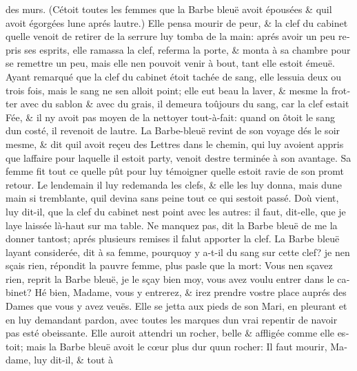 \documentclass[14pt,a4paper]{memoir}
\begin{document}
\begin{otherlanguage}{french}
des murs. (C\textquotesingle étoit toutes les femmes que la Barbe bleuë
avoit épousées \& qu\textquotesingle il avoit égorgées
l\textquotesingle une aprés l\textquotesingle autre.) Elle pensa mourir
de peur, \& la clef du cabinet qu\textquotesingle elle venoit de retirer
de la serrure luy tomba de la main: aprés avoir un peu repris ses
esprits, elle ramassa la clef, referma la porte, \& monta à sa chambre
pour se remettre un peu, mais elle n\textquotesingle en pouvoit venir à
bout, tant elle estoit émeuë. Ayant remarqué que la clef du cabinet
étoit tachée de sang, elle l\textquotesingle essuia deux ou trois fois,
mais le sang ne s\textquotesingle en alloit point; elle eut beau la
laver, \& mesme la frotter avec du sablon \& avec du grais, il demeura
toûjours du sang, car la clef estait Fée, \& il n\textquotesingle y
avoit pas moyen de la nettoyer tout-à-fait: quand on ôtoit le sang
d\textquotesingle un costé, il revenoit de l\textquotesingle autre. La
Barbe-bleuë revint de son voyage dés le soir mesme, \& dit
qu\textquotesingle il avoit reçeu des Lettres dans le chemin, qui luy
avoient appris que l\textquotesingle affaire pour laquelle il estoit
party, venoit d\textquotesingle estre terminée à son avantage. Sa femme
fit tout ce qu\textquotesingle elle pût pour luy témoigner
qu\textquotesingle elle estoit ravie de son promt retour. Le lendemain
il luy redemanda les clefs, \& elle les luy donna, mais
d\textquotesingle une main si tremblante, qu\textquotesingle il devina
sans peine tout ce qui s\textquotesingle estoit passé.
D\textquotesingle où vient, luy dit-il, que la clef du cabinet
n\textquotesingle est point avec les autres: il faut, dit-elle, que je
l\textquotesingle aye laissée là-haut sur ma table. Ne manquez pas, dit
la Barbe bleuë de me la donner tantost; aprés plusieurs remises il falut
apporter la clef. La Barbe bleuë l\textquotesingle ayant considerée, dit
à sa femme, pourquoy y a-t-il du sang sur cette clef? je
n\textquotesingle en sçais rien, répondit la pauvre femme, plus pasle
que la mort: Vous n\textquotesingle en sçavez rien, reprit la Barbe
bleuë, je le sçay bien moy, vous avez voulu entrer dans le cabinet? Hé
bien, Madame, vous y entrerez, \& irez prendre vostre place auprés des
Dames que vous y avez veuës. Elle se jetta aux pieds de son Mari, en
pleurant et en luy demandant pardon, avec toutes les marques
d\textquotesingle un vrai repentir de n\textquotesingle avoir pas esté
obeissante. Elle auroit attendri un rocher, belle \& affligée comme elle
estoit; mais la Barbe bleuë avoit le cœur plus dur qu\textquotesingle un
rocher: Il faut mourir, Madame, luy dit-il, \& tout à

\end{otherlanguage}
\end{document}
